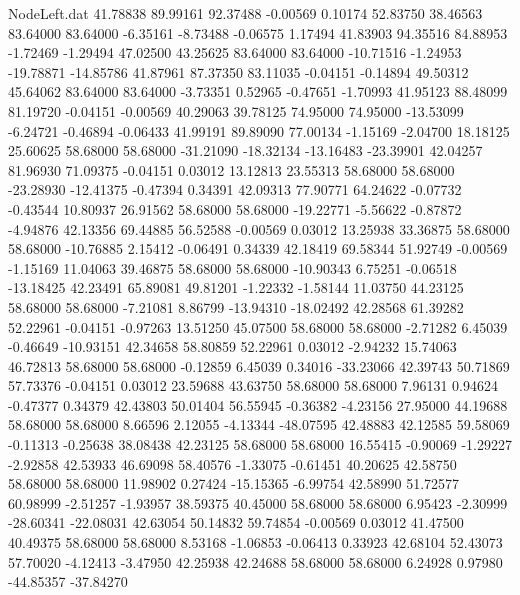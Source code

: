 \begin{filecontents}{NodeLeft.dat}
  41.78838   89.99161   92.37488    -0.00569    0.10174   52.83750   38.46563   83.64000   83.64000   -6.35161   -8.73488   -0.06575    1.17494
  41.83903   94.35516   84.88953    -1.72469   -1.29494   47.02500   43.25625   83.64000   83.64000  -10.71516   -1.24953  -19.78871  -14.85786
  41.87961   87.37350   83.11035    -0.04151   -0.14894   49.50312   45.64062   83.64000   83.64000   -3.73351    0.52965   -0.47651   -1.70993
  41.95123   88.48099   81.19720    -0.04151   -0.00569   40.29063   39.78125   74.95000   74.95000  -13.53099   -6.24721   -0.46894   -0.06433
  41.99191   89.89090   77.00134    -1.15169   -2.04700   18.18125   25.60625   58.68000   58.68000  -31.21090  -18.32134  -13.16483  -23.39901
  42.04257   81.96930   71.09375    -0.04151    0.03012   13.12813   23.55313   58.68000   58.68000  -23.28930  -12.41375   -0.47394    0.34391
  42.09313   77.90771   64.24622    -0.07732   -0.43544   10.80937   26.91562   58.68000   58.68000  -19.22771   -5.56622   -0.87872   -4.94876
  42.13356   69.44885   56.52588    -0.00569    0.03012   13.25938   33.36875   58.68000   58.68000  -10.76885    2.15412   -0.06491    0.34339
  42.18419   69.58344   51.92749    -0.00569   -1.15169   11.04063   39.46875   58.68000   58.68000  -10.90343    6.75251   -0.06518  -13.18425
  42.23491   65.89081   49.81201    -1.22332   -1.58144   11.03750   44.23125   58.68000   58.68000   -7.21081    8.86799  -13.94310  -18.02492
  42.28568   61.39282   52.22961    -0.04151   -0.97263   13.51250   45.07500   58.68000   58.68000   -2.71282    6.45039   -0.46649  -10.93151
  42.34658   58.80859   52.22961     0.03012   -2.94232   15.74063   46.72813   58.68000   58.68000   -0.12859    6.45039    0.34016  -33.23066
  42.39743   50.71869   57.73376    -0.04151    0.03012   23.59688   43.63750   58.68000   58.68000    7.96131    0.94624   -0.47377    0.34379
  42.43803   50.01404   56.55945    -0.36382   -4.23156   27.95000   44.19688   58.68000   58.68000    8.66596    2.12055   -4.13344  -48.07595
  42.48883   42.12585   59.58069    -0.11313   -0.25638   38.08438   42.23125   58.68000   58.68000   16.55415   -0.90069   -1.29227   -2.92858
  42.53933   46.69098   58.40576    -1.33075   -0.61451   40.20625   42.58750   58.68000   58.68000   11.98902    0.27424  -15.15365   -6.99754
  42.58990   51.72577   60.98999    -2.51257   -1.93957   38.59375   40.45000   58.68000   58.68000    6.95423   -2.30999  -28.60341  -22.08031
  42.63054   50.14832   59.74854    -0.00569    0.03012   41.47500   40.49375   58.68000   58.68000    8.53168   -1.06853   -0.06413    0.33923
  42.68104   52.43073   57.70020    -4.12413   -3.47950   42.25938   42.24688   58.68000   58.68000    6.24928    0.97980  -44.85357  -37.84270

\end{filecontents}
